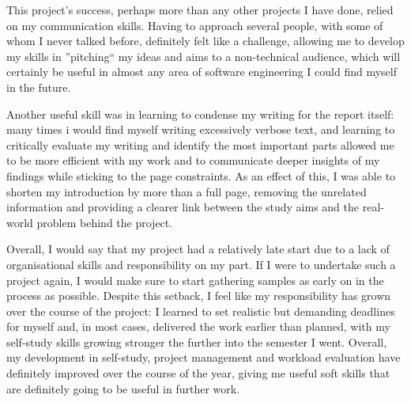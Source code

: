 \documentclass{./template/ReflectionsDoc}
\begin{document}
    This project's success, perhaps more than any other projects I have done, relied on my communication skills.
    Having to approach several people, with some of whom I never talked before, definitely felt like a challenge, allowing me to
    develop my skills in ''pitching`` my ideas and aims to a non-technical audience, which will certainly be useful in almost any area
    of software engineering I could find myself in the future.

    Another useful skill was in learning to condense my writing for the report itself: many times i would find myself
    writing excessively verbose text, and learning to critically evaluate my writing and identify the most important parts
    allowed me to be more efficient with my work and to communicate deeper insights of my findings while sticking to the page
    constraints.
    As an effect of this, I was able to shorten my introduction by more than a full page, removing the unrelated information and
    providing a clearer link between the study aims and the real-world problem behind the project.

    Overall, I would say that my project had a relatively late start due to a lack of organisational skills and responsibility on my part.
    If I were to undertake such a project again, I would make sure to start gathering samples as early on in the process as possible.
    Despite this setback, I feel like my responsibility has grown over the course of the project: I learned to set realistic but
    demanding deadlines for myself and, in most cases, delivered the work earlier than planned, with my self-study skills growing stronger
    the further into the semester I went.
    Overall, my development in self-study, project management and workload evaluation have definitely improved over the course of the year,
    giving me useful soft skills that are definitely going to be useful in further work.
\end{document}
